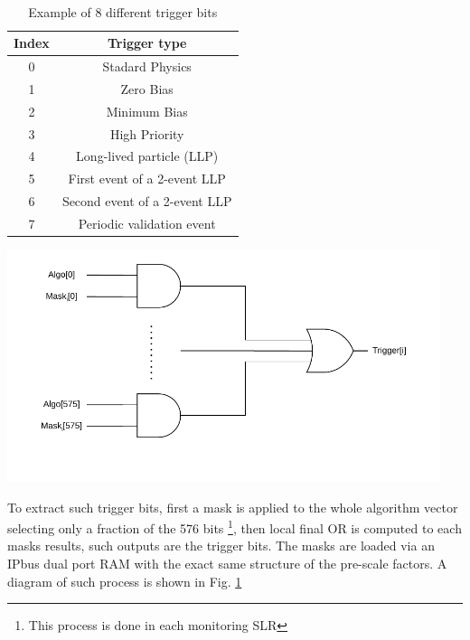 \documentclass[../../main.tex]{subfiles}
\begin{document}
\begin{table}[ht] \
  \begin{minipage}[b]{0.5\linewidth}
    \centering
    \begin{tabular}{|c|c|}
    \hline
    Index & Trigger type      \\
    \hline
    0 & Stadard Physics     \\
    1 & Zero Bias           \\
    2 & Minimum Bias            \\
    3 & High Priority       \\
    4 & Long-lived particle (LLP)    \\
    5 & First event of a 2-event LLP   \\
    6 & Second event of a 2-event LLP  \\
    7 & Periodic validation event      \\
    \hline
    \end{tabular}
    \caption{Example of 8 different trigger bits}
    \label{tab:trigger_types}
    \vspace{4ex}
  \end{minipage}%
  \begin{minipage}[b]{0.5\linewidth}
    \centering
    \includegraphics[width=0.95\textwidth]{sections/06/Images/TriggerMasks.pdf}
    \label{fig:TriggMasks}
    \vspace{4ex}
  \end{minipage} 
\end{table}

To extract such trigger bits, first a mask is applied to the whole algorithm vector selecting only a fraction of the 576 bits \footnote{This process is done in each monitoring SLR}, then local final OR is computed to each masks results, such outputs are the trigger bits. The masks are loaded via an IPbus dual port RAM with the exact same structure of the pre-scale factors. A diagram of such process is shown in Fig. \ref{fig:TriggMasks}
\end{document}
